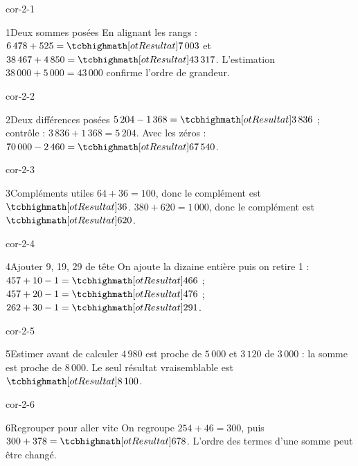 \clearpage\pagestyle{otMain}\setlength{\otBlocEspacement}{2.5mm}\fontsize{11}{15}\selectfont{}
\begin{blocLivre}{cor-2-1}\begin{corrige}{1}{Deux sommes posées}
En alignant les rangs : $6\,478+525=\res{7\,003}$ et $38\,467+4\,850=\res{43\,317}$. L’estimation $38\,000+5\,000=43\,000$ confirme l’ordre de grandeur.
\end{corrige}\end{blocLivre}
\begin{blocLivre}{cor-2-2}\begin{corrige}{2}{Deux différences posées}
$5\,204-1\,368=\res{3\,836}$ ; contrôle : $3\,836+1\,368=5\,204$. Avec les zéros : $70\,000-2\,460=\res{67\,540}$.
\end{corrige}\end{blocLivre}
\begin{blocLivre}{cor-2-3}\begin{corrige}{3}{Compléments utiles}
$64+36=100$, donc le complément est $\res{36}$. $380+620=1\,000$, donc le complément est $\res{620}$.
\end{corrige}\end{blocLivre}
\begin{blocLivre}{cor-2-4}\begin{corrige}{4}{Ajouter 9, 19, 29 de tête}
On ajoute la dizaine entière puis on retire 1 : $457+10-1=\res{466}$ ; $457+20-1=\res{476}$ ; $262+30-1=\res{291}$.
\end{corrige}\end{blocLivre}
\begin{blocLivre}{cor-2-5}\begin{corrige}{5}{Estimer avant de calculer}
$4\,980$ est proche de $5\,000$ et $3\,120$ de $3\,000$ : la somme est proche de $8\,000$. Le seul résultat vraisemblable est $\res{8\,100}$.
\end{corrige}\end{blocLivre}
\begin{blocLivre}{cor-2-6}\begin{corrige}{6}{Regrouper pour aller vite}
On regroupe $254+46=300$, puis $300+378=\res{678}$. L’ordre des termes d’une somme peut être changé.
\end{corrige}\end{blocLivre}
